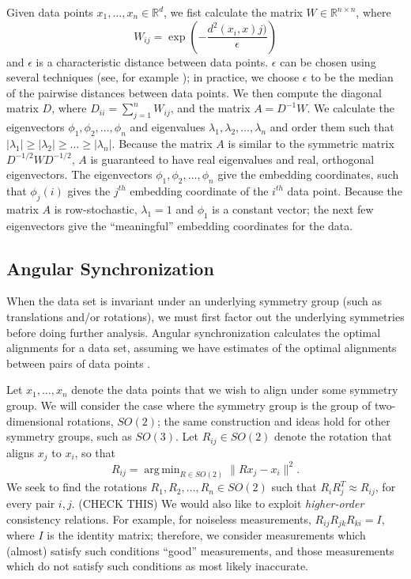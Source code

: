 \documentclass[10pt]{article}
\DeclareMathOperator*{\argmin}{arg\,min}
\begin{document}
Given data points $x_1, \dots, x_n \in \mathbb{R}^d$, we fist calculate the matrix $W \in \mathbb{R}^{n \times n}$, where 
\begin{equation}
W_{ij} = \exp \left( -\frac{d^2(x_i, x)j)}{\epsilon} \right)
\end{equation}
and $\epsilon$ is a characteristic distance between data points.
%
$\epsilon$ can be chosen using several techniques (see, for example \cite{coifman2008graph}); in practice, we choose $\epsilon$ to be the median of the pairwise distances between data points.
%
We then compute the diagonal matrix $D$, where $D_{ii} = \sum_{j=1}^{n} W_{ij}$, and the matrix $A = D^{-1} W$. 
%
We calculate the eigenvectors $\phi_1, \phi_2, \dots, \phi_n$ and eigenvalues $\lambda_1, \lambda_2, \dots, \lambda_n$ and order them such that $|\lambda_1| \ge |\lambda_2| \ge \dots \ge |\lambda_n|$. 
%
Because the matrix $A$ is similar to the symmetric matrix $D^{-1/2} W D^{-1/2}$, $A$ is guaranteed to have real eigenvalues and real, orthogonal eigenvectors. 
%
The eigenvectors $\phi_1, \phi_2, \dots, \phi_n$ give the embedding coordinates, such that $\phi_j(i)$ gives the $j^{th}$ embedding coordinate of the $i^{th}$ data point. 
%
Because the matrix $A$ is row-stochastic, $\lambda_1=1$ and $\phi_1$ is a constant vector; the next few eigenvectors give the ``meaningful'' embedding coordinates for the data. 

\subsection*{Angular Synchronization}

When the data set is invariant under an underlying symmetry group (such as translations and/or rotations), we must first factor out the underlying symmetries before doing further analysis.
%
Angular synchronization calculates the optimal alignments for a data set, assuming we have estimates of the optimal alignments between pairs of data points \cite{singer2011angular}. 

Let $x_1, \dots, x_n$ denote the data points that we wish to align under some symmetry group.
%
We will consider the case where the symmetry group is the group of two-dimensional rotations, $SO(2)$; the same construction and ideas hold for other symmetry groups, such as $SO(3)$. 
%
Let $R_{ij} \in SO(2)$ denote the rotation that aligns $x_j$ to $x_i$, so that
\begin{equation}
R_{ij} = \argmin_{R \in SO(2)} \|Rx_j - x_i \|^2.
\end{equation}
%
We seek to find the rotations $R_1, R_2, \dots, R_n \in SO(2)$ such that $R_i R_j^T \approx R_{ij}$, for every pair $i, j$. (CHECK THIS)
%
We would also like to exploit {\em higher-order} consistency relations.
%
For example, for noiseless measurements, $R_{ij} R_{jk} R_{ki} = I$, where $I$ is the identity matrix; therefore, we consider measurements which (almost) satisfy such conditions ``good'' measurements, and those measurements which do not satisfy such conditions as most likely inaccurate.
\end{document}
